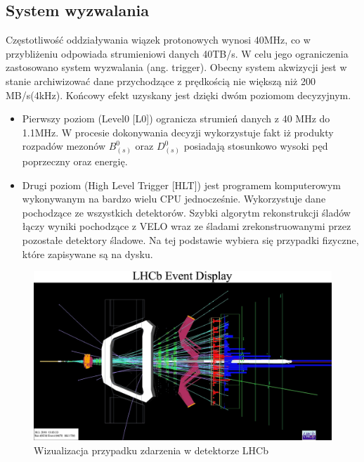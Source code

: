 \subsection{System wyzwalania}
Częstotliwość oddziaływania wiązek protonowych wynosi 40MHz, co w przybliżeniu odpowiada strumieniowi danych 40TB/s. W celu jego ograniczenia zastosowano system wyzwalania (ang. trigger). Obecny system akwizycji jest w stanie archiwizować dane przychodzące z prędkością nie większą niż 200 MB/s(4kHz). Końcowy efekt uzyskany jest dzięki dwóm poziomom decyzyjnym.
\begin{itemize}
 \item Pierwszy poziom (Level0 [L0]) ogranicza  strumień danych z 40 MHz do 1.1MHz. W procesie dokonywania decyzji wykorzystuje fakt iż produkty rozpadów mezonów $B_{(s)}^0$ oraz $D_{(s)}^0$ posiadają stosunkowo wysoki pęd poprzeczny oraz energię. 
 \item Drugi poziom (High Level Trigger [HLT]) jest programem komputerowym wykonywanym na bardzo wielu CPU jednocześnie. Wykorzystuje dane pochodzące ze wszystkich detektorów. Szybki algorytm rekonstrukcji śladów łączy wyniki pochodzące z VELO wraz ze śladami zrekonstruowanymi przez pozostałe detektory śladowe. Na tej podstawie wybiera się przypadki fizyczne, które zapisywane są na dysku.  
\end{itemize}
\begin{figure}[ht]
  \centering
  \includegraphics[scale=0.4]{rozdzial2/event.jpg}
  \caption{Wizualizacja przypadku zdarzenia w detektorze LHCb\cite{event}}
  \label{fig:event}
\end{figure}
